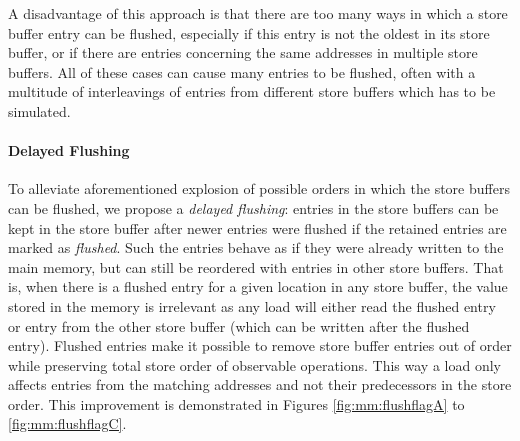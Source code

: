 A disadvantage of this approach is that there are too many ways in which a store
buffer entry can be flushed, especially if this entry is not the oldest in its
store buffer, or if there are entries concerning the same addresses in multiple store buffers.
All of these cases can cause many entries to be flushed, often with a multitude of interleavings of entries from different store buffers which has to be simulated.

\paragraph{Delayed Flushing} %
To alleviate aforementioned explosion of possible orders in which the store
buffers can be flushed, we propose a \emph{delayed flushing}: entries in the
store buffers can be kept in the store buffer after newer entries were flushed
if the retained entries are marked as \emph{flushed}.
Such the entries behave as if they were already written to the main memory, but can still be reordered with entries in other store buffers.
That is, when there is a flushed entry for a given location in any store buffer, the value stored in the memory is irrelevant as any load will either read the flushed entry or entry from the other store buffer (which can be written after the flushed entry).
Flushed entries make it possible to remove store buffer entries out of order while preserving total store order of observable operations.
This way a load only affects entries from the matching addresses and not their predecessors in the store order.
This improvement is demonstrated in Figures \ref{fig:mm:flushflagA} to \ref{fig:mm:flushflagC}.


